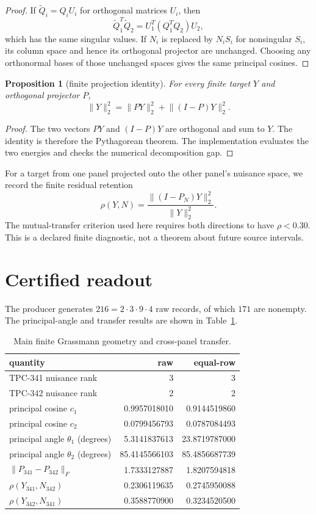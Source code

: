 \documentclass[11pt]{article}
\newtheorem{proposition}{Proposition}
\newcommand{\norm}[1]{\lVert #1\rVert_2}
\begin{document}
\begin{proof}
If $\widetilde Q_i=Q_iU_i$ for orthogonal matrices $U_i$, then
\[
\widetilde Q_1^T\widetilde Q_2
 =U_1^T(Q_1^TQ_2)U_2,
\]
which has the same singular values.  If $N_i$ is replaced by $N_iS_i$ for
nonsingular $S_i$, its column space and hence its orthogonal projector are
unchanged.  Choosing any orthonormal bases of those unchanged spaces gives
the same principal cosines.
\end{proof}

\begin{proposition}[finite projection identity]
\label{prop:projection}
For every finite target $Y$ and orthogonal projector $P$,
\[
\norm{Y}^{2}=\norm{PY}^{2}+\norm{(I-P)Y}^{2}.
\]
\end{proposition}

\begin{proof}
The two vectors $PY$ and $(I-P)Y$ are orthogonal and sum to $Y$.  The
identity is therefore the Pythagorean theorem.  The implementation evaluates
the two energies and checks the numerical decomposition gap.
\end{proof}

For a target from one panel projected onto the other panel's nuisance space,
we record the finite residual retention
\[
 \rho(Y,N)=\frac{\norm{(I-P_N)Y}^{2}}{\norm{Y}^{2}}.       \tag{1}
\]
The mutual-transfer criterion used here requires both directions to have
$\rho<0.30$.  This is a declared finite diagnostic, not a theorem about
future source intervals.

\section{Certified readout}

The producer generates $216=2\cdot3\cdot9\cdot4$ raw records, of which
$171$ are nonempty.  The principal-angle and transfer results are shown in
Table~\ref{tab:geometry}.

\begin{table}[ht]
\centering
\caption{Main finite Grassmann geometry and cross-panel transfer.}
\label{tab:geometry}
\begin{tabular}{lrr}
\toprule
quantity & raw & equal-row\\
\midrule
TPC-341 nuisance rank & 3 & 3\\
TPC-342 nuisance rank & 2 & 2\\
principal cosine $c_1$ & 0.9957018010 & 0.9144519860\\
principal cosine $c_2$ & 0.0799456793 & 0.0787084493\\
principal angle $\theta_1$ (degrees) & 5.3141837613 & 23.8719787000\\
principal angle $\theta_2$ (degrees) & 85.4145566103 & 85.4856687739\\
$\lVert P_{341}-P_{342}\rVert_F$ & 1.7333127887 & 1.8207594818\\
$\rho(Y_{341},N_{342})$ & 0.2306119635 & 0.2745950088\\
$\rho(Y_{342},N_{341})$ & 0.3588770900 & 0.3234520500\\
\bottomrule
\end{tabular}
\end{table}
\end{document}
